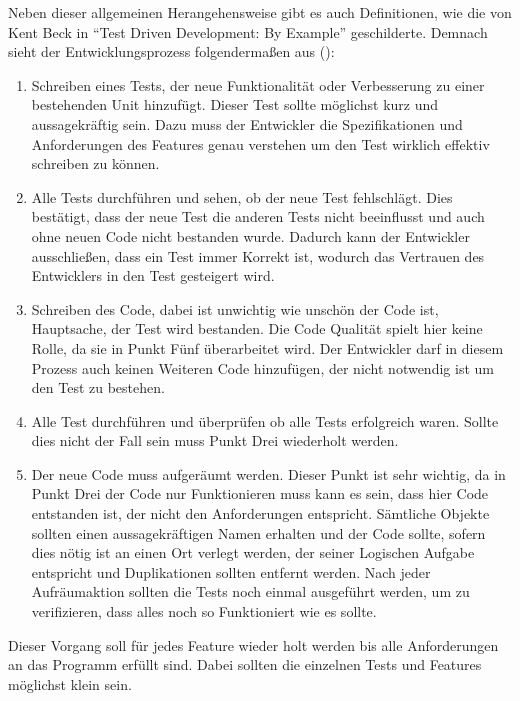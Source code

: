 Neben dieser allgemeinen Herangehensweise gibt es auch Definitionen, wie die von Kent Beck in
"`Test Driven Development: By Example"' geschilderte. Demnach sieht der Entwicklungsprozess
folgendermaßen aus (\cite{beck:tdd}):
\begin{enumerate}
    \item Schreiben eines Tests, der neue Funktionalität oder Verbesserung zu einer bestehenden Unit
    hinzufügt. Dieser Test sollte möglichst kurz und aussagekräftig sein. Dazu muss der Entwickler
    die Spezifikationen und Anforderungen des Features genau verstehen um den Test wirklich effektiv
    schreiben zu können.
    \item Alle Tests durchführen und sehen, ob der neue Test fehlschlägt. Dies bestätigt, dass der
    neue Test die anderen Tests nicht beeinflusst und auch ohne neuen Code nicht bestanden wurde.
    Dadurch kann der Entwickler ausschließen, dass ein Test immer Korrekt ist, wodurch das Vertrauen
    des Entwicklers in den Test gesteigert wird.
    \item Schreiben des Code, dabei ist unwichtig wie unschön der Code ist, Hauptsache, der Test wird
    bestanden. Die Code Qualität spielt hier keine Rolle, da sie in Punkt Fünf überarbeitet wird.
    Der Entwickler darf in diesem Prozess auch keinen Weiteren Code hinzufügen, der nicht notwendig
    ist um den Test zu bestehen.
    \item Alle Test durchführen und überprüfen ob alle Tests erfolgreich waren. Sollte dies nicht der
    Fall sein muss Punkt Drei wiederholt werden.
    \item Der neue Code muss aufgeräumt werden. Dieser Punkt ist sehr wichtig, da in Punkt Drei der
    Code nur Funktionieren muss kann es sein, dass hier Code entstanden ist, der nicht den Anforderungen
    entspricht. Sämtliche Objekte sollten einen aussagekräftigen Namen erhalten und der Code sollte,
    sofern dies nötig ist an einen Ort verlegt werden, der seiner Logischen Aufgabe entspricht und
    Duplikationen sollten entfernt werden. Nach jeder Aufräumaktion sollten die Tests noch einmal
    ausgeführt werden, um zu verifizieren, dass alles noch so Funktioniert wie es sollte.
\end{enumerate}
\noindent
Dieser Vorgang soll für jedes Feature wieder holt werden bis alle Anforderungen an das Programm
erfüllt sind. Dabei sollten die einzelnen Tests und Features möglichst klein sein.
